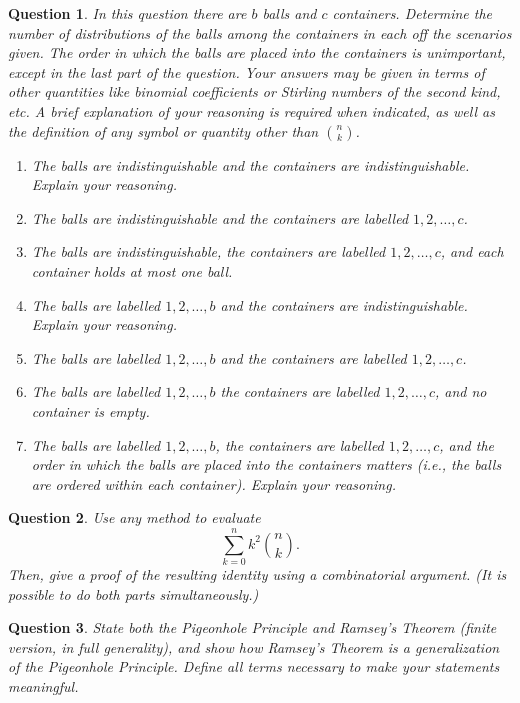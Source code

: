 \documentclass[12]{article}
\newtheorem{question}{Question}
\theoremstyle{definition}
\begin{document}
	\begin{question}
		In this question there are $b$ balls and $c$ containers.  Determine the number of distributions of the balls among the containers in each off the scenarios given.  The order in which the balls are placed into the containers is unimportant, except in the last part of the question.  Your answers may be given in terms of other quantities like binomial coefficients or Stirling numbers of the second kind, etc.  A brief explanation of your reasoning is required when indicated, as well as the definition of any symbol or quantity other than ${n \choose k}$.
		\begin{enumerate}
			\item The balls are indistinguishable and the containers are indistinguishable.  Explain your reasoning.
			\item The balls are indistinguishable and the containers are labelled $1, 2, \ldots, c$.
			\item The balls are indistinguishable, the containers are labelled $1, 2, \ldots, c$, and each container holds at most one ball.
			\item The balls are labelled $1, 2, \ldots, b$ and the containers are indistinguishable. Explain your reasoning.
			\item The balls are labelled $1, 2, \ldots, b$ and the containers are labelled $1, 2, \ldots, c$.
			\item The balls are labelled $1, 2, \ldots, b$ the containers are labelled $1, 2, \ldots, c$, and no container is empty.
			\item The balls are labelled $1, 2, \ldots, b$, the containers are labelled $1, 2, \ldots, c$, and the order in which the balls are placed into the containers matters (\textit{i.e.}, the balls are ordered within each container).  Explain your reasoning.
		\end{enumerate}
	\end{question}

	\begin{question}
		Use any method to evaluate
		$$ \sum_{k=0}^n k^2 {n \choose k}.$$
		Then, give a proof of the resulting identity using a combinatorial argument.  (It is possible to do both parts simultaneously.)
	\end{question}

	\begin{question}
		State both the Pigeonhole Principle and Ramsey's Theorem (finite version, in full generality), and show how Ramsey's Theorem is a generalization of the Pigeonhole Principle.  Define all terms necessary to make your statements meaningful.
	\end{question}
\end{document}
